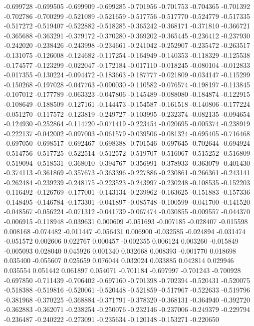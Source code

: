 -0.699728
-0.699505
-0.699909
-0.699285
-0.701956
-0.701753
-0.704365
-0.701392
-0.702786
-0.700299
-0.521089
-0.521659
-0.517756
-0.517770
-0.524779
-0.517335
-0.517272
-0.519407
-0.522882
-0.518285
-0.365242
-0.368171
-0.371810
-0.366721
-0.365688
-0.363291
-0.379172
-0.370280
-0.369202
-0.365445
-0.236412
-0.237930
-0.242020
-0.238426
-0.243998
-0.234661
-0.241042
-0.252907
-0.235472
-0.263517
-0.131075
-0.126008
-0.124682
-0.117254
-0.164949
-0.140353
-0.118329
-0.125538
-0.174577
-0.123299
-0.022047
-0.172184
-0.017110
-0.018245
-0.080104
-0.012833
-0.017355
-0.130224
-0.094472
-0.183663
-0.187777
-0.021809
-0.034147
-0.115299
-0.150268
-0.197028
-0.047763
-0.090030
-0.110582
-0.076574
-0.198197
-0.113845
-0.107012
-0.177789
-0.063323
-0.047806
-0.145489
-0.088080
-0.184874
-0.122915
-0.108649
-0.188509
-0.127161
-0.144473
-0.154587
-0.161518
-0.140806
-0.177224
-0.051270
-0.117572
-0.123819
-0.249727
-0.103995
-0.232374
-0.082135
-0.094654
-0.124930
-0.252864
-0.114720
-0.071419
-0.223454
-0.020695
-0.005374
-0.238919
-0.222137
-0.042002
-0.097003
-0.061579
-0.039506
-0.081324
-0.695405
-0.716468
-0.697050
-0.698517
-0.692467
-0.698388
-0.701546
-0.697645
-0.702644
-0.694924
-0.514756
-0.517725
-0.522514
-0.512572
-0.519707
-0.516067
-0.515252
-0.516809
-0.519094
-0.518531
-0.368010
-0.394767
-0.356991
-0.378933
-0.363079
-0.401430
-0.374113
-0.361869
-0.357673
-0.363396
-0.227886
-0.230861
-0.266361
-0.243141
-0.262484
-0.239239
-0.248175
-0.223523
-0.243997
-0.230248
-0.108535
-0.152203
-0.116492
-0.126769
-0.177001
-0.143134
-0.239962
-0.163625
-0.151883
-0.157336
-0.148495
-0.146784
-0.173301
-0.041897
-0.085748
-0.100599
-0.041700
-0.141520
-0.048567
-0.056224
-0.071312
-0.041739
-0.067474
-0.030855
-0.009557
-0.044370
-0.006915
-0.118948
-0.039631
0.000609
-0.051693
-0.007185
-0.028407
-0.015598
0.008168
-0.074482
-0.011447
-0.056431
0.006900
-0.032585
-0.024894
-0.031474
-0.051572
0.002606
0.022767
0.000457
-0.002355
0.006124
0.003260
-0.015849
-0.005093
0.028040
0.045926
0.001340
0.032668
0.008393
-0.001770
0.018698
0.035400
-0.055607
0.025659
0.076044
0.032024
0.033885
0.042814
0.029946
0.035554
0.051442
0.061897
0.054071
-0.701184
-0.697997
-0.701243
-0.700928
-0.697850
-0.711439
-0.706402
-0.697160
-0.701398
-0.702394
-0.520431
-0.520075
-0.518388
-0.519816
-0.520061
-0.520448
-0.521859
-0.517967
-0.522633
-0.519796
-0.381968
-0.370225
-0.368884
-0.371791
-0.378320
-0.368131
-0.364940
-0.392720
-0.362883
-0.362071
-0.238254
-0.250076
-0.232146
-0.237006
-0.249379
-0.229794
-0.236487
-0.240222
-0.273091
-0.235634
-0.120148
-0.153271
-0.220650
